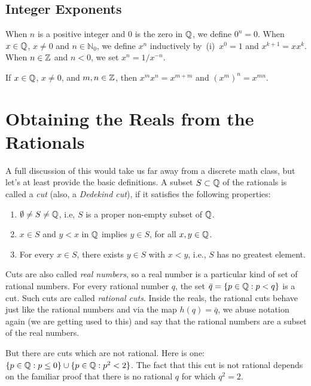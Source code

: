 \subsection{Integer Exponents}

When $n$ is a positive integer and $0$ is the zero in $\mathbb{Q}$, we
define $0^n=0$.  When $x\in\mathbb{Q}$, $x\neq 0$ and $n\in\mathbb{N}_0$,
we define $x^n$ inductively by~(i)~$x^0=1$ and $x^{k+1}=xx^k$.  When
$n\in\mathbb{Z}$ and $n<0$, we set $x^n=1/x^{-n}$.

\begin{theorem}
If $x\in\mathbb{Q}$, $x\neq0$, and $m,n\in\mathbb{Z}$, then
$x^mx^n=x^{m+m}$ and $(x^m)^n=x^{mn}$.
\end{theorem}

\section{Obtaining the Reals from the Rationals}\label{s:background:reals}

A full discussion of this would take us far away from 
a discrete math class, but let's at least provide the
basic definitions.  A subset $S\subset \mathbb{Q}$ of the rationals
is called a \textit{cut} (also, a \textit{Dedekind cut}), 
if it satisfies the following properties:

\begin{enumerate}
\item $\emptyset\neq S\neq \mathbb{Q}$, i.e, $S$ is a proper non-empty subset
of $\mathbb{Q}$.
\item $x\in S$ and $y<x$ in $\mathbb{Q}$ implies $y\in S$, for all $x,y\in \mathbb{Q}$.
\item For every $x\in S$, there exists $y\in S$ with $x<y$, i.e., 
$S$ has no greatest element.
\end{enumerate}

Cuts are also called \textit{real numbers}, so a real number is
a particular kind of set of rational numbers.
For every rational number $q$, the set $\bar{q}= \{p\in \mathbb{Q}: p< q\}$
is a cut.  Such cuts are called \textit{rational cuts}.  Inside
the reals, the rational cuts behave just like the rational
numbers and via the map $h(q)=\bar{q}$, we abuse notation again
(we are getting used to this) and say that
the rational numbers are a subset of the real numbers.  

But there are cuts which are not rational.  Here is one:
$\{p\in \mathbb{Q}: p\le 0\}\cup \{p\in \mathbb{Q}: p^2<2\}$.  The fact that
this cut is not rational depends on the familiar proof that
there is no rational $q$ for which $q^2=2$.

